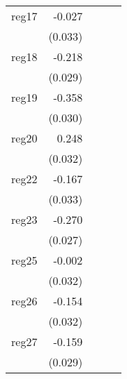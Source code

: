 {\begin{longtable}{l*{4}{D{.}{.}{-1}}}
\addlinespace
reg17       &      -0.027         &                     &                     &                     \\
            &     (0.033)         &                     &                     &                     \\
\addlinespace
reg18       &      -0.218\sym{***}&                     &                     &                     \\
            &     (0.029)         &                     &                     &                     \\
\addlinespace
reg19       &      -0.358\sym{***}&                     &                     &                     \\
            &     (0.030)         &                     &                     &                     \\
\addlinespace
reg20       &       0.248\sym{***}&                     &                     &                     \\
            &     (0.032)         &                     &                     &                     \\
\addlinespace
reg22       &      -0.167\sym{***}&                     &                     &                     \\
            &     (0.033)         &                     &                     &                     \\
\addlinespace
reg23       &      -0.270\sym{***}&                     &                     &                     \\
            &     (0.027)         &                     &                     &                     \\
\addlinespace
reg25       &      -0.002         &                     &                     &                     \\
            &     (0.032)         &                     &                     &                     \\
\addlinespace
reg26       &      -0.154\sym{***}&                     &                     &                     \\
            &     (0.032)         &                     &                     &                     \\
\addlinespace
reg27       &      -0.159\sym{***}&                     &                     &                     \\
            &     (0.029)         &                     &                     &                     \\

\end{longtable}}
